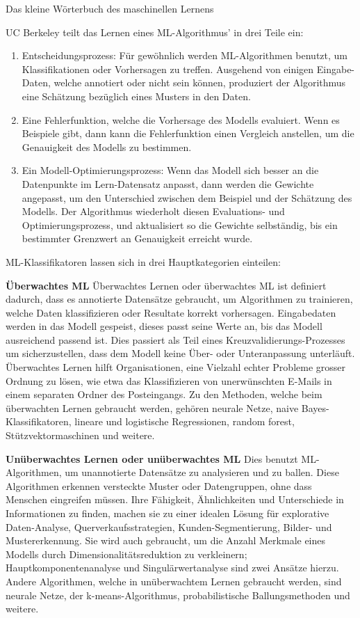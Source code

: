 \begin{lpu}{Das kleine Wörterbuch des maschinellen Lernens}
\begin{artikelbox}
UC Berkeley teilt das Lernen eines ML-Algorithmus' in drei Teile ein:
\begin{enumerate}
\item Entscheidungsprozess: Für gewöhnlich werden ML-Algorithmen benutzt, um Klassifikationen oder Vorhersagen zu treffen. Ausgehend von einigen Eingabe-Daten, welche annotiert oder nicht sein können, produziert der Algorithmus eine Schätzung bezüglich eines Musters in den Daten.
\item Eine Fehlerfunktion, welche die Vorhersage des Modells evaluiert. Wenn es Beispiele gibt, dann kann die Fehlerfunktion einen Vergleich anstellen, um die Genauigkeit des Modells zu bestimmen.
\item Ein Modell-Optimierungsprozess: Wenn das Modell sich besser an die Datenpunkte im Lern-Datensatz anpasst, dann werden die Gewichte angepasst, um den Unterschied zwischen dem Beispiel und der Schätzung des Modells. Der Algorithmus wiederholt diesen Evaluations- und Optimierungsprozess, und aktualisiert so die Gewichte selbständig, bis ein bestimmter Grenzwert an Genauigkeit erreicht wurde.
\end{enumerate}

ML-Klassifikatoren lassen sich in drei Hauptkategorien einteilen:

\textbf{Überwachtes ML}
Überwachtes Lernen oder überwachtes ML ist definiert dadurch, dass es annotierte Datensätze gebraucht, um Algorithmen zu trainieren, welche Daten klassifizieren oder Resultate korrekt vorhersagen. Eingabedaten werden in das Modell gespeist, dieses passt seine Werte an, bis das Modell ausreichend passend ist. Dies passiert als Teil eines Kreuzvalidierungs-Prozesses um sicherzustellen, dass dem Modell keine Über- oder Unteranpassung unterläuft. Überwachtes Lernen hilft Organisationen, eine Vielzahl echter Probleme grosser Ordnung zu lösen, wie etwa das Klassifizieren von unerwünschten E-Mails in einem separaten Ordner des Posteingangs. Zu den Methoden, welche beim überwachten Lernen gebraucht werden, gehören neurale Netze, naive Bayes-Klassifikatoren, lineare und logistische Regressionen, random forest, Stützvektormaschinen und weitere.


\textbf{Unüberwachtes Lernen oder unüberwachtes ML}
Dies benutzt ML-Algorithmen, um unannotierte Datensätze zu analysieren und zu ballen. Diese Algorithmen erkennen versteckte Muster oder Datengruppen, ohne dass Menschen eingreifen müssen. Ihre Fähigkeit, Ähnlichkeiten und Unterschiede in Informationen zu finden, machen sie zu einer idealen Lösung für explorative Daten-Analyse, Querverkaufsstrategien, Kunden-Segmentierung, Bilder- und Mustererkennung. Sie wird auch gebraucht, um die Anzahl Merkmale eines Modells durch Dimensionalitätsreduktion zu verkleinern; Hauptkomponentenanalyse und Singulärwertanalyse sind zwei Ansätze hierzu. Andere Algorithmen, welche in unüberwachtem Lernen gebraucht werden, sind neurale Netze, der k-means-Algorithmus, probabilistische Ballungsmethoden und weitere.


\end{artikelbox}
\end{lpu}
